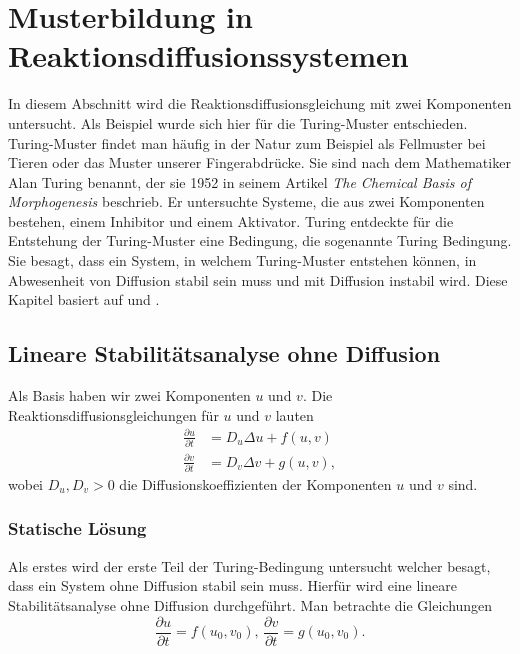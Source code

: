 %
%
%
%
\section{Musterbildung in Reaktionsdiffusionssystemen
\label{reaktdiff:section:teil1}}

In diesem Abschnitt wird die Reaktionsdiffusionsgleichung mit zwei Komponenten untersucht.
Als Beispiel wurde sich hier für die Turing-Muster entschieden.
Turing-Muster findet man häufig in der Natur zum Beispiel als Fellmuster bei Tieren oder  das Muster unserer Fingerabdrücke.
Sie sind nach dem Mathematiker Alan Turing benannt, der sie 1952 in seinem Artikel \textit{The Chemical Basis of Morphogenesis} \cite{turing1952chemical} beschrieb.
Er untersuchte Systeme, die aus zwei Komponenten bestehen, einem Inhibitor und einem Aktivator.
Turing entdeckte für die Entstehung der Turing-Muster eine Bedingung, die sogenannte Turing Bedingung.
Sie besagt, dass ein System, in welchem Turing-Muster entstehen können, in Abwesenheit von Diffusion stabil sein muss und mit Diffusion instabil wird.
Diese Kapitel basiert auf \cite{reaktdiff:turing_patterns_2019} und \cite{reaktdiff:hoyle2006pattern}.

\subsection{Lineare Stabilitätsanalyse ohne Diffusion
\label{reaktdiff:subsection:mathe}}
Als Basis haben wir zwei Komponenten \(u\) und \(v\).
Die Reaktionsdiffusionsgleichungen für \(u\) und \(v\) lauten
\begin{align*}
    \frac{\partial u}{\partial t} &= D_u \Delta u + f(u,v)\\
    \label{reaktdiff:equation:reaktdiff2}
    \frac{\partial v}{\partial t} &= D_v \Delta v + g(u,v),
\end{align*}
wobei \(D_u, D_v > 0\) die Diffusionskoeffizienten der Komponenten \(u\) und \(v\) sind.

\subsubsection{Statische Lösung}
Als erstes wird der erste Teil der Turing-Bedingung untersucht welcher besagt, dass ein System ohne Diffusion stabil sein muss.
Hierfür wird eine lineare Stabilitätsanalyse ohne Diffusion durchgeführt.
Man betrachte die Gleichungen
\begin{equation}
    \label{reaktdiff:equation:reaktdiff2ohneDiff}
    \frac{\partial u}{\partial t} = f(u_0,v_0),\,
    \frac{\partial v}{\partial t} = g(u_0,v_0).
\end{equation}

